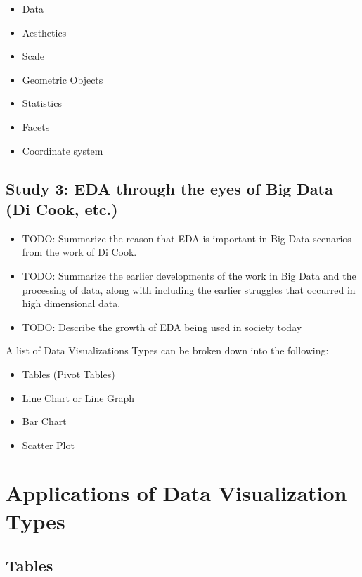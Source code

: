 \documentclass[print]{nuthesis}
\providecommand{\tightlist}{%
  \setlength{\itemsep}{0pt}\setlength{\parskip}{0pt}}
\begin{document}
\begin{itemize}
\tightlist
\item
  Data
\item
  Aesthetics
\item
  Scale
\item
  Geometric Objects
\item
  Statistics
\item
  Facets
\item
  Coordinate system
\end{itemize}

\hypertarget{study-3-eda-through-the-eyes-of-big-data-di-cook-etc.}{%
\subsection{Study 3: EDA through the eyes of Big Data (Di Cook, etc.)}\label{study-3-eda-through-the-eyes-of-big-data-di-cook-etc.}}

\begin{itemize}
\tightlist
\item
  TODO: Summarize the reason that EDA is important in Big Data scenarios from the work of Di Cook.
\item
  TODO: Summarize the earlier developments of the work in Big Data and the processing of data, along with including the earlier struggles that occurred in high dimensional data.
\item
  TODO: Describe the growth of EDA being used in society today
\end{itemize}

A list of Data Visualizations Types can be broken down into the following:

\begin{itemize}
\tightlist
\item
  Tables (Pivot Tables)
\item
  Line Chart or Line Graph
\item
  Bar Chart
\item
  Scatter Plot
\end{itemize}

\hypertarget{applications-of-data-visualization-types}{%
\section{Applications of Data Visualization Types}\label{applications-of-data-visualization-types}}

\hypertarget{tables}{%
\subsection{Tables}\label{tables}}
\end{document}

